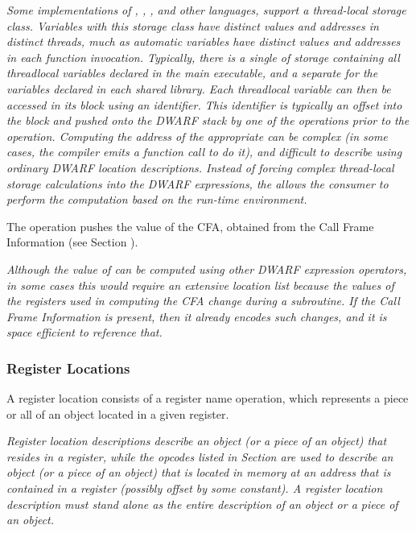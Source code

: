 \textit{Some implementations of
, , , and other
languages, support a
thread-local storage class. Variables with this storage class
have distinct values and addresses in distinct threads, much
as automatic variables have distinct values and addresses in
each function invocation. Typically, there is a single 
of storage containing all thread\dash local variables declared in
the main executable, and a separate  for the variables
declared in each shared library. Each
thread\dash local variable can then be accessed in its block using an
identifier. This identifier is typically an offset into the block and
pushed onto the DWARF stack by one of the
\DWOPconstnx{} operations prior to the
\DWOPformtlsaddress{} operation.
Computing the address of
the appropriate  can be complex (in some cases, the
compiler emits a function call to do it), and difficult
to describe using ordinary DWARF location descriptions.
Instead of    forcing complex thread-local storage calculations into
the DWARF expressions, the \DWOPformtlsaddress{} allows the consumer
to perform the computation based on the run-time environment.}

\itembfnl{\DWOPcallframecfaTARG}
The \DWOPcallframecfaNAME{}
operation pushes the value of the
CFA, obtained from the Call Frame Information
(see Section ).

\textit{Although the value of \DWATframebase{}
can be computed using other DWARF expression operators,
in some cases this would require an extensive location list
because the values of the registers used in computing the
CFA change during a subroutine. If the
Call Frame Information
is present, then it already encodes such changes, and it is
space efficient to reference that.}

\subsubsection{Register Locations}
\label{chap:registerlocations}
A register location consists of a register name operation, which
represents a piece or all of an object located in a given register.

\textit{Register location descriptions describe an object
(or a piece of an object) that resides in a register, while
the opcodes listed in
Section 
are used to describe an object (or a piece of
an object) that is located in memory at an address that is
contained in a register (possibly offset by some constant). A
register location description must stand alone as the entire
description of an object or a piece of an object.
}

